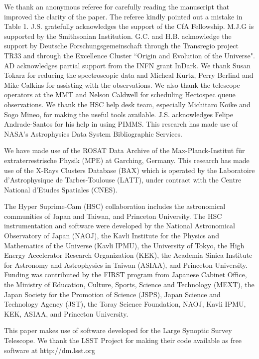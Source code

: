 \documentclass[iop, apj]{emulateapj}
\begin{document}
\acknowledgments
We thank an anonymous referee for carefully reading the manuscript that improved the clarity of the paper. 
The referee kindly pointed out a mistake in Table 1. 
J.S. gratefully acknowledges the support of the CfA Fellowship.  
M.J.G is supported by the Smithsonian Institution. 
G.C. and H.B. acknowledge the support by Deutsche Forschungsgemeinschaft through the Transregio project TR33
 and through the Excellence Cluster ``Origin and Evolution of the Universe".
AD acknowledges partial support from the INFN grant InDark.  
We thank Susan Tokarz for reducing the spectroscopic data and 
 Micheal Kurtz, Perry Berlind and Mike Calkins for assisting with the observations. 
We also thank the telescope operators at the MMT and Nelson Caldwell
 for scheduling Hectospec queue observations.
We thank the HSC help desk team, especially Michitaro Koike and Sogo Mineo, for making the useful tools available.
J.S. acknowledges Felipe Andrade-Santos for his help in using PIMMS.
This research has made use of NASA’s Astrophysics Data System Bibliographic Services.  

We have made use of the ROSAT Data Archive of 
 the Max-Planck-Institut f{\"u}r extraterrestrische Physik (MPE) at Garching, Germany.
This research has made use of the X-Rays Clusters Database (BAX)
 which is operated by the Laboratoire d'Astrophysique de Tarbes-Toulouse (LATT),
 under contract with the Centre National d'Etudes Spatiales (CNES).

The Hyper Suprime-Cam (HSC) collaboration includes 
 the astronomical communities of Japan and Taiwan, and Princeton University. 
The HSC instrumentation and software 
 were developed by the National Astronomical Observatory of Japan (NAOJ), 
 the Kavli Institute for the Physics and Mathematics of the Universe (Kavli IPMU),
 the University of Tokyo, the High Energy Accelerator Research Organization (KEK), 
 the Academia Sinica Institute for Astronomy and Astrophysics in Taiwan (ASIAA), 
 and Princeton University. 
Funding was contributed by the FIRST program from Japanese Cabinet Office, 
 the Ministry of Education, Culture, Sports, Science and Technology (MEXT), 
 the Japan Society for the Promotion of Science (JSPS), Japan Science and Technology Agency (JST), 
 the Toray Science Foundation, NAOJ, Kavli IPMU, KEK, ASIAA, and Princeton University. 

This paper makes use of software developed for 
 the Large Synoptic Survey Telescope. 
We thank the LSST Project for making their code available as free software at  http://dm.lsst.org
\end{document}
